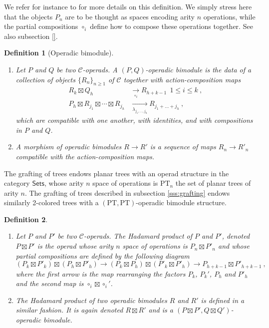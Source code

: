 \documentclass[twoside, 12pt]{amsart}
\newtheorem{definition}{Definition}[section]
\theoremstyle{remark}
\begin{document}
We refer for instance to \cite[Chapter 5]{LodayVallette12} for more details on this definition. We simply stress here that the objects $P_n$ are to be thought as spaces encoding arity $n$ operations, while the partial compositions $\circ_i$ define how to compose these operations together. See also subsection \ref{}.

\begin{definition}[Operadic bimodule]
\begin{enumerate}[leftmargin=*]
\item Let $P$ and $Q$ be two $\mathcal{C}$-operads. A \emph{$(P,Q)$-operadic bimodule} is the data of a collection of objects $\{ R_n \}_{n \geqslant 1}$ of $\mathcal{C}$ together with \emph{action-composition maps}
\begin{align*}
R_k \boxtimes Q_h &\underset{\circ_i}{\longrightarrow} R_{h+k-1} \ \ 1 \leqslant i \leqslant k \ ,  \\
P_h \boxtimes R_{j_1} \boxtimes \cdots \boxtimes R_{j_h} &\underset{\lambda_{j_1,\dots,j_h}}{\longrightarrow} R_{j_1 + \dots + j_h} \ ,
\end{align*}
which are compatible with one another, with identities, and with compositions in $P$ and $Q$. 
\item A \emph{morphism of operadic bimodules} $R \rightarrow R'$ is a sequence of maps $R_n \rightarrow R'_n$ compatible with the action-composition maps.
\end{enumerate}
\end{definition}

The grafting of trees endows planar trees with an operad structure in the category $\mathsf{Sets}$, whose arity $n$ space of operations is $\mathrm{PT}_n$ the set of planar trees of arity $n$. The grafting of trees described in subsection \ref{sss:grafting} endows similarly 2-colored trees with a $(\mathrm{PT},\mathrm{PT})$-operadic bimodule structure. 

\begin{definition} \label{def:hadamard-product}
\begin{enumerate}[leftmargin=*]
    \item Let $P$ and $P'$ be two $\mathcal{C}$-operads. The Hadamard product of $P$ and $P'$, denoted $P \boxtimes P'$ is the operad whose arity $n$ space of operations is $P_n \boxtimes P'_n$ and whose partial compositions are defined by the following diagram
    \[ (P_k \boxtimes P'_k) \boxtimes (P_h \boxtimes P'_h) \longrightarrow (P_k \boxtimes P_h) \boxtimes (P'_k \boxtimes P'_h) \longrightarrow P_{h+k-1} \boxtimes P'_{h+k-1} \ , \]
    where the first arrow is the map rearranging the factors $P_k$, $P_k'$, $P_h$ and $P'_h$ and the second map is $\circ_i \boxtimes \circ_i'$.
    \item The Hadamard product of two operadic bimodules $R$ and $R'$ is defined in a similar fashion. It is again denoted $R \boxtimes R'$ and is a $(P \boxtimes P' , Q \boxtimes Q')$-operadic bimodule.
\end{enumerate}
\end{definition}
\end{document}
